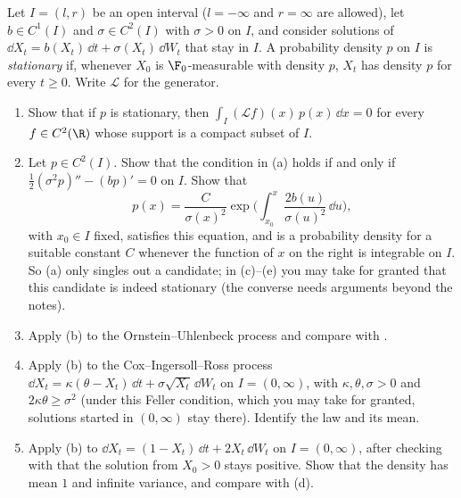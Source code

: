\begin{exercise}\label{ex:sde-stationary}
\medium Let $I=(l,r)$ be an open interval ($l=-\infty$ and $r=\infty$ are allowed), let
$b\in C^1(I)$ and $\sigma\in C^2(I)$ with $\sigma>0$ on $I$, and consider solutions of
$\dd X_t=b(X_t)\,\dd t+\sigma(X_t)\,\dd W_t$ that stay in $I$. A probability density $p$ on
$I$ is \emph{stationary} if, whenever $X_0$ is $\F_0$-measurable with density $p$, $X_t$ has
density $p$ for every $t\ge0$. Write $\mathcal L$ for the generator.
\begin{enumerate}[label=(\alph*)]
  \item Show that if $p$ is stationary, then $\int_I(\mathcal Lf)(x)\,p(x)\,\dd x=0$ for every
    $f\in C^2(\R)$ whose support is a compact subset of $I$.
  \item Let $p\in C^2(I)$. Show that the condition in (a) holds if and only if
    $\frac12(\sigma^2p)''-(bp)'=0$ on $I$. Show that
    \[
      p(x)=\frac{C}{\sigma(x)^2}\exp\Big(\int_{x_0}^x\frac{2b(u)}{\sigma(u)^2}\,\dd u\Big),
    \]
    with $x_0\in I$ fixed, satisfies this equation, and is a probability density for a suitable
    constant $C$ whenever the function of $x$ on the right is integrable on $I$. So (a) only
    singles out a candidate; in (c)--(e) you may take for granted that this candidate is
    indeed stationary (the converse needs arguments beyond the notes).
  \item Apply (b) to the Ornstein--Uhlenbeck process and compare with .
  \item Apply (b) to the Cox--Ingersoll--Ross process
    $\dd X_t=\kappa(\theta-X_t)\,\dd t+\sigma\sqrt{X_t}\,\dd W_t$ on $I=(0,\infty)$, with
    $\kappa,\theta,\sigma>0$ and $2\kappa\theta\ge\sigma^2$ (under this Feller condition,
    which you may take for granted, solutions started in $(0,\infty)$ stay there). Identify the
    law and its mean.
  \item Apply (b) to $\dd X_t=(1-X_t)\,\dd t+2X_t\,\dd W_t$ on $I=(0,\infty)$, after checking
    with  that the solution from $X_0>0$ stays positive. Show that
    the density has mean $1$ and infinite variance, and compare with (d).
\end{enumerate}
\end{exercise}

